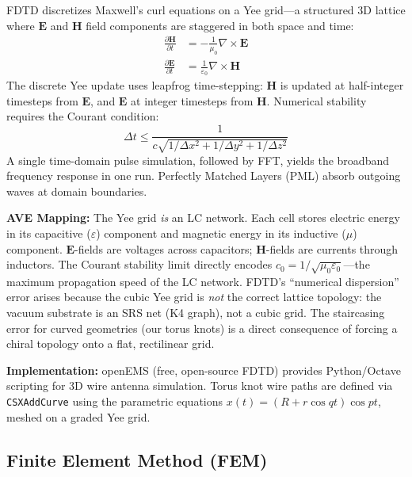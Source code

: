 FDTD discretizes Maxwell's curl equations on a Yee grid---a structured 3D lattice where $\mathbf{E}$ and $\mathbf{H}$ field components are staggered in both space and time:
\begin{align}
    \frac{\partial \mathbf{H}}{\partial t} &= -\frac{1}{\mu_0} \nabla \times \mathbf{E} \\
    \frac{\partial \mathbf{E}}{\partial t} &= \frac{1}{\varepsilon_0} \nabla \times \mathbf{H}
\end{align}
The discrete Yee update uses leapfrog time-stepping: $\mathbf{H}$ is updated at half-integer timesteps from $\mathbf{E}$, and $\mathbf{E}$ at integer timesteps from $\mathbf{H}$. Numerical stability requires the Courant condition:
\begin{equation}
    \Delta t \le \frac{1}{c\sqrt{1/\Delta x^2 + 1/\Delta y^2 + 1/\Delta z^2}}
\end{equation}
A single time-domain pulse simulation, followed by FFT, yields the broadband frequency response in one run. Perfectly Matched Layers (PML) absorb outgoing waves at domain boundaries.

\textbf{AVE Mapping:} The Yee grid \textit{is} an LC network. Each cell stores electric energy in its capacitive ($\varepsilon$) component and magnetic energy in its inductive ($\mu$) component. $\mathbf{E}$-fields are voltages across capacitors; $\mathbf{H}$-fields are currents through inductors. The Courant stability limit directly encodes $c_0 = 1/\sqrt{\mu_0 \varepsilon_0}$---the maximum propagation speed of the LC network. FDTD's ``numerical dispersion'' error arises because the cubic Yee grid is \textit{not} the correct lattice topology: the vacuum substrate is an SRS net (K4 graph), not a cubic grid. The staircasing error for curved geometries (our torus knots) is a direct consequence of forcing a chiral topology onto a flat, rectilinear grid.

\textbf{Implementation:} openEMS (free, open-source FDTD) provides Python/Octave scripting for 3D wire antenna simulation. Torus knot wire paths are defined via \texttt{CSXAddCurve} using the parametric equations $x(t) = (R + r\cos qt)\cos pt$, meshed on a graded Yee grid.

\subsection{Finite Element Method (FEM)}

